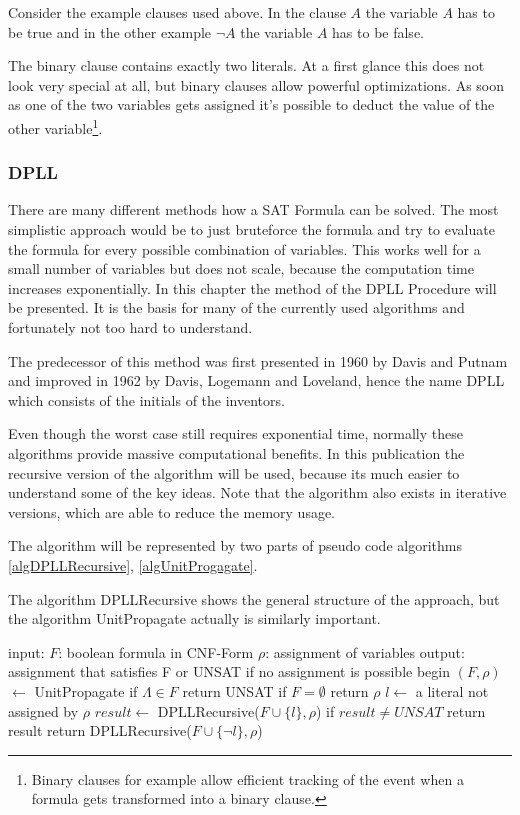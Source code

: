 Consider the example clauses used above. In the clause $A$ the variable $A$ has to be true and in the other example $\lnot A$ the variable $A$ has to be false.

The binary clause contains exactly two literals. At a first glance this does not look very special at all, but binary clauses allow powerful optimizations. As soon as one of the two variables gets assigned it's possible to deduct the value of the other variable\footnote{Binary clauses for example allow efficient tracking of the event when a formula gets transformed into a binary clause.}.
\subsubsection{DPLL}

There are many different methods how a SAT Formula can be solved. The most simplistic approach would be to just bruteforce the formula and try to evaluate the formula for every possible combination of variables. This works well for a small number of variables but does not scale, because the computation time increases exponentially. In this chapter the method of the DPLL Procedure will be presented. It is the basis for many of the currently used algorithms and fortunately not too hard to understand.

The predecessor of this method was first presented in 1960 by Davis and Putnam and improved in 1962 by Davis, Logemann and Loveland, hence the name DPLL which consists of the initials of the inventors.

Even though the worst case still requires exponential time, normally these algorithms provide massive computational benefits. In this publication the recursive version of the algorithm will be used, because its much easier to understand some of the key ideas. Note that the algorithm also exists in iterative versions, which are able to reduce the memory usage.

The algorithm will be represented by two parts of pseudo code algorithms \ref{algDPLLRecursive}, \ref{algUnitProgagate}.

The algorithm DPLLRecursive shows the general structure of the approach, but the algorithm UnitPropagate actually is similarly important.

\begin{algorithm}[caption={DPLLRecursive}, label={algDPLLRecursive}]
 input: $F$: boolean formula in CNF-Form
	$\rho$: assignment of variables
 output: assignment that satisfies F or 
	UNSAT if no assignment is possible
 begin
   $(F, \rho)$  $\gets$ UnitPropagate
   if $\Lambda \in F$
       return UNSAT
   if $F = \emptyset$
       return $\rho$
   $l \gets$ a literal not assigned by $\rho$
   $result \gets$ DPLLRecursive($F \cup \{l\}, \rho$)
   if $result \neq UNSAT$
       return result
   return DPLLRecursive($F \cup \{\lnot l\}, \rho$)
\end{algorithm}


